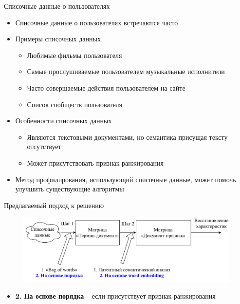 \documentclass{beamer}
\begin{document}
\begin{frame}{Списочные данные о пользователях}
    \begin{itemize}
        \item {Списочные данные о пользователях встречаются часто}
        \item {Примеры списочных данных}
            \begin{itemize}
                \item {Любимые фильмы пользователя}
                \item {Самые прослушиваемые пользователем музыкальные исполнители}
                \item {Часто совершаемые действия пользователем на сайте}
                \item {Список сообществ пользователя}
            \end{itemize}
        \item {Особенности списочных данных}
            \begin{itemize}
                \item {Являются текстовыми документами, но семантика присущая тексту отсутствует}
                \item {Может присутствовать признак ранжирования}
            \end{itemize}
        \item {Метод профилирования, использующий списочные данные,
            может помочь улучшить существующие алгоритмы}
    \end{itemize}
\end{frame}

\begin{frame}{Предлагаемый подход к решению}
    \begin{figure}
        \includegraphics[width=\textwidth]{figures/presentation-concept.pdf}
    \end{figure}
    \begin{itemize}
        \item \textbf{\color{blue} 2. На основе порядка} -- если присутствует признак ранжирования
    \end{itemize}
\end{frame}
\end{document}
